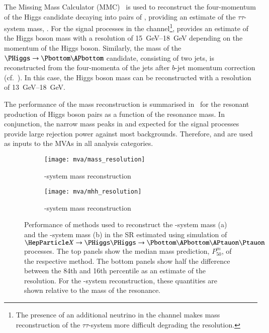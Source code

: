 The Missing Mass Calculator (MMC)~\cite{Elagin:2010aw} is used to
reconstruct the four-momentum of the Higgs candidate decaying into
pairs of \tauleptons, providing an estimate of the $\tau\tau$-system
mass, \mMMC. For the signal processes in the \hadhad
channel\footnote{The presence of an additional neutrino in the \lephad
  channel makes mass reconstruction of the $\tau\tau$-system more
  difficult degrading the resolution.}, \mMMC provides an estimate of
the Higgs boson mass with a resolution
of \SIrange{15}{18}{\GeV} depending on the momentum of the Higgs
boson. Similarly, the mass of the $\PHiggs \ra \Pbottom\APbottom$
candidate, consisting of two \btagged jets, is reconstructed from the
four-momenta of the jets after $b$-jet momentum correction
(cf.~). In this case, the Higgs boson mass can be
reconstructed with a resolution of \SIrange{13}{18}{\GeV}.

The performance of the \PHiggs mass reconstruction is summarised
in~ for the resonant production of
Higgs boson pairs as a function of the resonance mass. In conjunction,
the narrow mass peaks in \mMMC and \mBB expected for the signal
processes provide large rejection power against most
backgrounds. Therefore, \mMMC and \mBB are used as inputs to the MVAs
in all analysis categories.


\begin{figure}[htbp]
  \centering

  \begin{subfigure}[t]{.5\textwidth}
    \centering
    \texttt{[image: mva/mass\_resolution]}
    \caption{\PHiggs-system mass reconstruction}
    \label{fig:mass_reconstruction_H}
  \end{subfigure}\hfill%
  \begin{subfigure}[t]{.5\textwidth}
    \centering
    \texttt{[image: mva/mhh\_resolution]}
    \caption{\HH-system mass reconstruction}
    \label{fig:mass_reconstruction_HH}
  \end{subfigure}

  \caption{Performance of methods used to reconstruct the
    \PHiggs-system mass (a) and the \HH-system mass (b) in the \hadhad
    SR estimated using simulation of $\PX \ra \HH \ra \bbtautau$
    processes. The top panels show the median mass prediction,
    $P_{50}^{m}$, of the respective method. The bottom panels show
    half the difference between the 84th and 16th percentile as an
    estimate of the resolution. For the \HH-system reconstruction,
    these quantities are shown relative to the mass of the resonance.}
  \label{fig:mass_reconstruction}
\end{figure}

